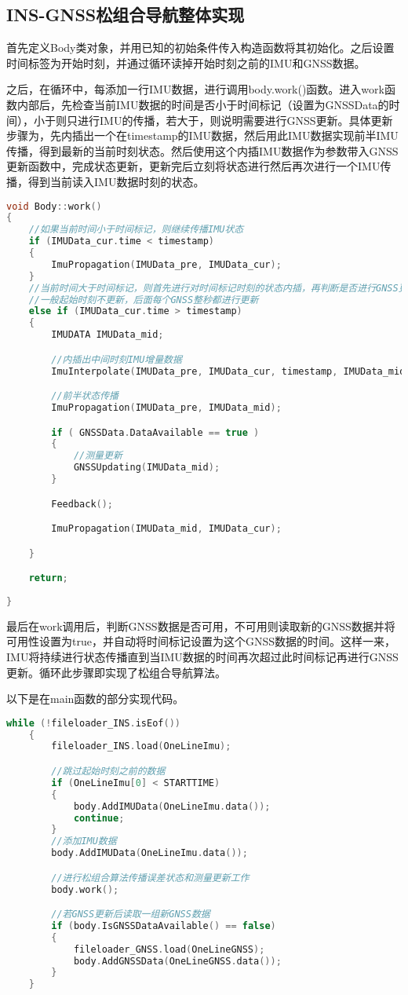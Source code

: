 \documentclass[codepkg=listings,theme=fancy]{course-report}
\begin{document}
\subsection{INS-GNSS松组合导航整体实现}

首先定义Body类对象，并用已知的初始条件传入构造函数将其初始化。之后设置时间标签为开始时刻，并通过循环读掉开始时刻之前的IMU和GNSS数据。

之后，在循环中，每添加一行IMU数据，进行调用body.work()函数。进入work函数内部后，先检查当前IMU数据的时间是否小于时间标记（设置为GNSSData的时间），小于则只进行IMU的传播，若大于，则说明需要进行GNSS更新。具体更新步骤为，先内插出一个在timestamp的IMU数据，然后用此IMU数据实现前半IMU传播，得到最新的当前时刻状态。然后使用这个内插IMU数据作为参数带入GNSS更新函数中，完成状态更新，更新完后立刻将状态进行然后再次进行一个IMU传播，得到当前读入IMU数据时刻的状态。
\begin{lstlisting}[language=C++,emph={Matrix,ANGLE,Vector,IMUError,IMUDATA,IMUNoise,GNSSDATA,IMUBOX},emphstyle=\color{cyan}]
void Body::work()
{
	//如果当前时间小于时间标记，则继续传播IMU状态
	if (IMUData_cur.time < timestamp)
	{
		ImuPropagation(IMUData_pre, IMUData_cur);
	}
	//当前时间大于时间标记，则首先进行对时间标记时刻的状态内插，再判断是否进行GNSS更新
	//一般起始时刻不更新，后面每个GNSS整秒都进行更新
	else if (IMUData_cur.time > timestamp)
	{
		IMUDATA IMUData_mid;

		//内插出中间时刻IMU增量数据
		ImuInterpolate(IMUData_pre, IMUData_cur, timestamp, IMUData_mid);

		//前半状态传播
		ImuPropagation(IMUData_pre, IMUData_mid);

		if ( GNSSData.DataAvailable == true )
		{
			//测量更新
			GNSSUpdating(IMUData_mid);
		}

		Feedback();

		ImuPropagation(IMUData_mid, IMUData_cur);

	}

	return;
	
}
\end{lstlisting}
最后在work调用后，判断GNSS数据是否可用，不可用则读取新的GNSS数据并将可用性设置为true，并自动将时间标记设置为这个GNSS数据的时间。这样一来，IMU将持续进行状态传播直到当IMU数据的时间再次超过此时间标记再进行GNSS更新。循环此步骤即实现了松组合导航算法。

以下是在main函数的部分实现代码。
\begin{lstlisting}[language=C++,emph={Matrix,ANGLE,Vector,IMUError,IMUDATA,IMUNoise,GNSSDATA,IMUBOX},emphstyle=\color{cyan}]
	while (!fileloader_INS.isEof())
	{
		fileloader_INS.load(OneLineImu);

		//跳过起始时刻之前的数据
		if (OneLineImu[0] < STARTTIME)
		{
			body.AddIMUData(OneLineImu.data());
			continue;
		}
		//添加IMU数据
		body.AddIMUData(OneLineImu.data());

		//进行松组合算法传播误差状态和测量更新工作
		body.work();

		//若GNSS更新后读取一组新GNSS数据
		if (body.IsGNSSDataAvailable() == false)
		{
			fileloader_GNSS.load(OneLineGNSS);
			body.AddGNSSData(OneLineGNSS.data());
		}
	}

\end{lstlisting}
\end{document}
